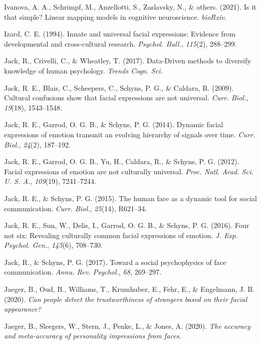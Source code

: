 \documentclass[12pt,american,a4paper,oneside,]{memoir} %
\begin{document}
\leavevmode\hypertarget{ref-Ivanova2021-wk}{}%
Ivanova, A. A., Schrimpf, M., Anzellotti, S., Zaslavsky, N., \& others. (2021). Is it that simple? Linear mapping models in cognitive neuroscience. \emph{bioRxiv}.

\leavevmode\hypertarget{ref-Izard1994-ca}{}%
Izard, C. E. (1994). Innate and universal facial expressions: Evidence from developmental and cross-cultural research. \emph{Psychol. Bull.}, \emph{115}(2), 288--299.

\leavevmode\hypertarget{ref-Jack2017-qp}{}%
Jack, R., Crivelli, C., \& Wheatley, T. (2017). Data-Driven methods to diversify knowledge of human psychology. \emph{Trends Cogn. Sci.}

\leavevmode\hypertarget{ref-Jack2009-yy}{}%
Jack, R. E., Blais, C., Scheepers, C., Schyns, P. G., \& Caldara, R. (2009). Cultural confusions show that facial expressions are not universal. \emph{Curr. Biol.}, \emph{19}(18), 1543--1548.

\leavevmode\hypertarget{ref-Jack2014-ku}{}%
Jack, R. E., Garrod, O. G. B., \& Schyns, P. G. (2014). Dynamic facial expressions of emotion transmit an evolving hierarchy of signals over time. \emph{Curr. Biol.}, \emph{24}(2), 187--192.

\leavevmode\hypertarget{ref-Jack2012-eq}{}%
Jack, R. E., Garrod, O. G. B., Yu, H., Caldara, R., \& Schyns, P. G. (2012). Facial expressions of emotion are not culturally universal. \emph{Proc. Natl. Acad. Sci. U. S. A.}, \emph{109}(19), 7241--7244.

\leavevmode\hypertarget{ref-Jack2015-sh}{}%
Jack, R. E., \& Schyns, P. G. (2015). The human face as a dynamic tool for social communication. \emph{Curr. Biol.}, \emph{25}(14), R621--34.

\leavevmode\hypertarget{ref-Jack2016-jq}{}%
Jack, R. E., Sun, W., Delis, I., Garrod, O. G. B., \& Schyns, P. G. (2016). Four not six: Revealing culturally common facial expressions of emotion. \emph{J. Exp. Psychol. Gen.}, \emph{145}(6), 708--730.

\leavevmode\hypertarget{ref-Jack2017-gt}{}%
Jack, R., \& Schyns, P. G. (2017). Toward a social psychophysics of face communication. \emph{Annu. Rev. Psychol.}, \emph{68}, 269--297.

\leavevmode\hypertarget{ref-Jaeger2020-sr}{}%
Jaeger, B., Oud, B., Williams, T., Krumhuber, E., Fehr, E., \& Engelmann, J. B. (2020). \emph{Can people detect the trustworthiness of strangers based on their facial appearance?}

\leavevmode\hypertarget{ref-Jaeger2020-bn}{}%
Jaeger, B., Sleegers, W., Stern, J., Penke, L., \& Jones, A. (2020). \emph{The accuracy and meta-accuracy of personality impressions from faces}.
\end{document}
